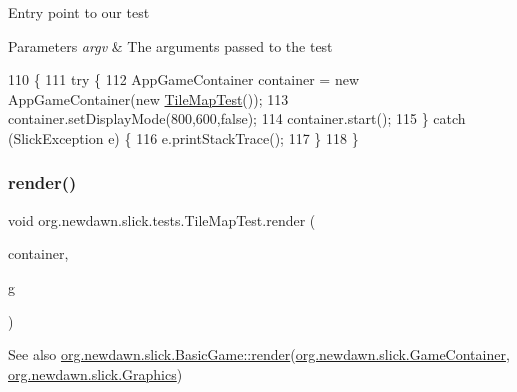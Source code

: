 Entry point to our test


\begin{DoxyParams}{Parameters}
{\em argv} & The arguments passed to the test \\
\hline
\end{DoxyParams}

\begin{DoxyCode}
110                                            \{
111         \textcolor{keywordflow}{try} \{
112             AppGameContainer container = \textcolor{keyword}{new} AppGameContainer(\textcolor{keyword}{new} \mbox{\hyperlink{classorg_1_1newdawn_1_1slick_1_1tests_1_1_tile_map_test_a495420c73e623307230d768ea2883759}{TileMapTest}}());
113             container.setDisplayMode(800,600,\textcolor{keyword}{false});
114             container.start();
115         \} \textcolor{keywordflow}{catch} (SlickException e) \{
116             e.printStackTrace();
117         \}
118     \}
\end{DoxyCode}
\mbox{\label{classorg_1_1newdawn_1_1slick_1_1tests_1_1_tile_map_test_a6d57608e6ac0a82eb5140c26925cde48}} 
\subsubsection{\texorpdfstring{render()}{render()}}
{\footnotesize\ttfamily void org.\+newdawn.\+slick.\+tests.\+Tile\+Map\+Test.\+render (\begin{DoxyParamCaption}\item[{\mbox{\hyperlink{classorg_1_1newdawn_1_1slick_1_1_game_container}{Game\+Container}}}]{container,  }\item[{\mbox{\hyperlink{classorg_1_1newdawn_1_1slick_1_1_graphics}{Graphics}}}]{g }\end{DoxyParamCaption})\hspace{0.3cm}{\ttfamily [inline]}}

\begin{DoxySeeAlso}{See also}
\mbox{\hyperlink{interfaceorg_1_1newdawn_1_1slick_1_1_game_af1a4670d43eb3ba04dfcf55ab1975b64}{org.\+newdawn.\+slick.\+Basic\+Game\+::render}}(\mbox{\hyperlink{classorg_1_1newdawn_1_1slick_1_1_game_container}{org.\+newdawn.\+slick.\+Game\+Container}}, \mbox{\hyperlink{classorg_1_1newdawn_1_1slick_1_1_graphics}{org.\+newdawn.\+slick.\+Graphics}}) 
\end{DoxySeeAlso}


